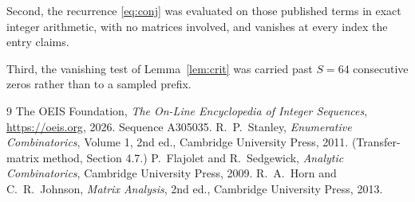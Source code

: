 \documentclass[11pt,a4paper]{article}
\theoremstyle{plain}
\theoremstyle{definition}
\begin{document}
Second, the recurrence \eqref{eq:conj} was evaluated on those published terms in exact
integer arithmetic, with no matrices involved, and vanishes at every index the entry claims.

Third, the vanishing test of Lemma~\ref{lem:crit} was carried past $S=64$ consecutive
zeros rather than to a sampled prefix.

\begin{thebibliography}{9}
 The OEIS Foundation, \emph{The On-Line Encyclopedia of Integer
Sequences}, \url{https://oeis.org}, 2026. Sequence A305035.
 R.~P.~Stanley, \emph{Enumerative Combinatorics}, Volume 1, 2nd ed.,
Cambridge University Press, 2011. (Transfer-matrix method, Section 4.7.)
 P.~Flajolet and R.~Sedgewick, \emph{Analytic Combinatorics}, Cambridge
University Press, 2009.
 R.~A.~Horn and C.~R.~Johnson, \emph{Matrix Analysis}, 2nd ed., Cambridge
University Press, 2013.
\end{thebibliography}
\end{document}
